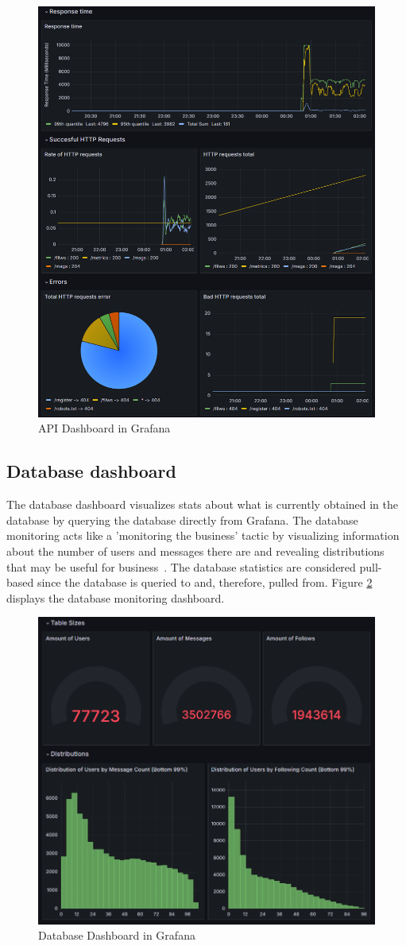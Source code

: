 \documentclass[12pt, a4paper, oneside]{book}
\begin{document}
\begin{figure}[H]
    \centering
    \includegraphics[width=0.7\linewidth]{images/api-dashboard.png}
    \caption{API Dashboard in Grafana}
    \label{fig:api-dashboard}
\end{figure}

\subsection{Database dashboard}
The database dashboard visualizes stats about what is currently obtained in the database by querying the database directly from Grafana.
The database monitoring acts like a 'monitoring the business' tactic by visualizing information about the number of users and messages there are and revealing distributions that may be useful for business~\cite{julian2018}.
The database statistics are considered pull-based since the database is queried to and, therefore, pulled from.
Figure \ref{fig:db-dashboard} displays the database monitoring dashboard.

\begin{figure}[H]
    \centering
    \includegraphics[width=0.8\linewidth]{images/database-dashboard.png}
    \caption{Database Dashboard in Grafana}
    \label{fig:db-dashboard}
\end{figure}
\end{document}

